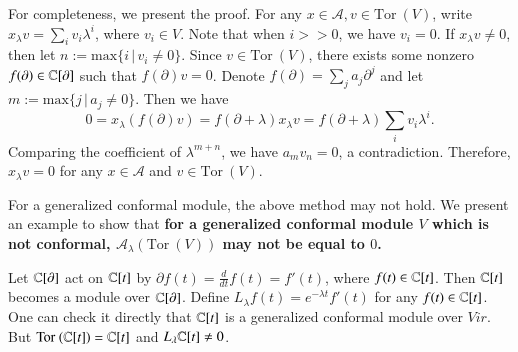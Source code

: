 \documentclass[12pt]{amsart}
\begin{document}
For completeness, we present the proof.
For any $x\in \mathcal{A}, v\in \text{Tor}~(V)$,
write $x_\lambda v=\sum_i v_i \lambda^i$, where $v_i\in V$. Note that when $i>>0$, we have $v_i=0$.
If $x_\lambda v\neq 0$, then let $n:=\text{max}\{i\,|\,v_i\neq0\}$.
Since $v\in \text{Tor}~(V)$, there exists some nonzero $f(\partial)\in\mathbb{C}[\partial]$ such that $f(\partial)v=0$.
Denote $f(\partial)=\sum_j a_j \partial^j$ and let $m:=\text{max}\{j\,|\,a_j\neq 0\}$.
Then we have
$$0=x_\lambda (f(\partial)v)=f(\partial+\lambda)x_\lambda v=f(\partial+\lambda)\sum_i v_i \lambda^i.$$
Comparing the coefficient of $\lambda^{m+n}$, we have
$a_mv_n=0$, a contradiction. Therefore, $x_\lambda v=0$ for any $x\in \mathcal{A}$ and $v\in \text{Tor}~(V)$.

For a generalized conformal module, the above method may not hold. We present an example to show that {\bf for a generalized conformal module $V$ which is not conformal, $\mathcal{A}_\lambda (\text{Tor}~(V))$ may not be equal to $0$.}

\begin{ex}Let $\mathbb{C}[\partial]$ act on $\mathbb{C}[t]$ by
$\partial f(t)=\frac{d}{dt}f(t)=f'(t)$, where $f(t)\in \mathbb{C}[t]$. Then $\mathbb{C}[t]$ becomes a module over $\mathbb{C}[\partial]$.
Define $L_\lambda f(t)=e^{-\lambda t}f'(t)$ for any $f(t)\in \mathbb{C}[t]$.
One can check it directly that $\mathbb{C}[t]$ is a generalized conformal module over $Vir$. But
$\text{Tor}~(\mathbb{C}[t])=\mathbb{C}[t]$ and $L_\lambda \mathbb{C}[t]\neq 0$.
\end{ex}
\end{document}
